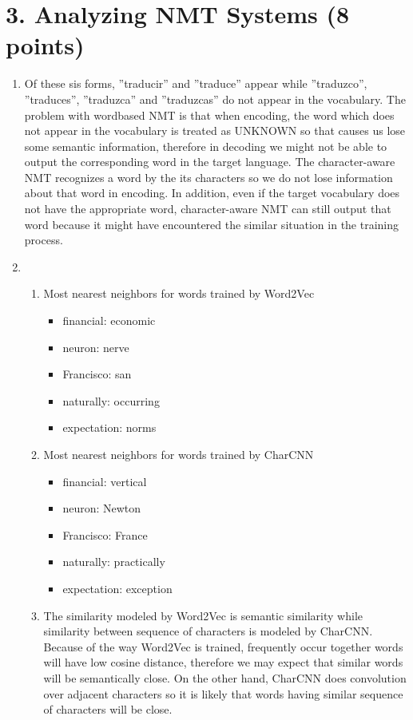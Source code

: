 \documentclass[12pt]{article}
\begin{document}
\section*{3. Analyzing NMT Systems (8 points)}
\begin{enumerate}[label=(\alph*)]
  \item
  Of these sis forms, ”traducir” and ”traduce” appear while ”traduzco”, ”traduces”, ”traduzca” and ”traduzcas” do not appear in the vocabulary. The problem with wordbased NMT is that when encoding, the word which does not appear in the vocabulary is treated as UNKNOWN so that causes us lose some semantic information, therefore in decoding we might not be able to output the corresponding word in the target language. The character-aware NMT recognizes a word by the its characters so we do not lose information about that word in encoding. In addition, even if the target vocabulary does not have the appropriate word, character-aware NMT can still output that word because it might have encountered the similar situation in the training process.
  \item
  \begin{enumerate}[label=\roman*]
  \item
  Most nearest neighbors for words trained by Word2Vec
  \begin{itemize}
    \item financial: economic
    \item neuron: nerve
    \item Francisco: san
    \item naturally: occurring
    \item expectation: norms
  \end{itemize}
  \item
  Most nearest neighbors for words trained by CharCNN
  \begin{itemize}
    \item financial: vertical 
    \item neuron: Newton 
    \item Francisco: France
    \item naturally: practically
    \item expectation: exception 
  \end{itemize}
  \item 
  The similarity modeled by Word2Vec is semantic similarity while similarity between sequence of characters is modeled by CharCNN. Because of the way Word2Vec is trained, frequently occur together words will have low cosine distance, therefore we may expect that similar words will be semantically close. On the other hand, CharCNN does convolution over adjacent characters so it is likely that words having similar sequence of characters will be close.

\end{enumerate}
\end{enumerate}
\end{document}
